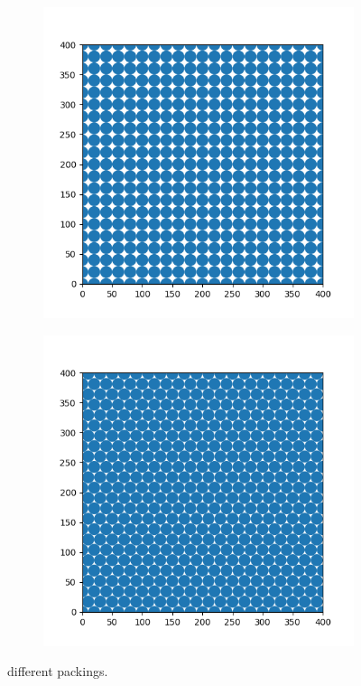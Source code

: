 \documentclass{article}
\begin{document}
\begin{figure}[h]
	\centering
	\begin{subfigure}[t]{0.38\linewidth}
		\centering
		\includegraphics[width = 1.0\linewidth, trim={0 0 0 0}, clip=true]{square.png}
		\subcaption{}
		\label{fig:prot}	
	\end{subfigure}
	\hspace{0.06\linewidth}
	\begin{subfigure}[t]{0.38\linewidth}
		\centering
		\includegraphics[width = 1.0\linewidth, trim={0 0 0 0}, clip=true]{hexagonal.png}
		\subcaption{}
		\label{fig:domains}	
	\end{subfigure}
\label{fig:4elj}
\caption{different packings.}
\end{figure}
\end{document}
